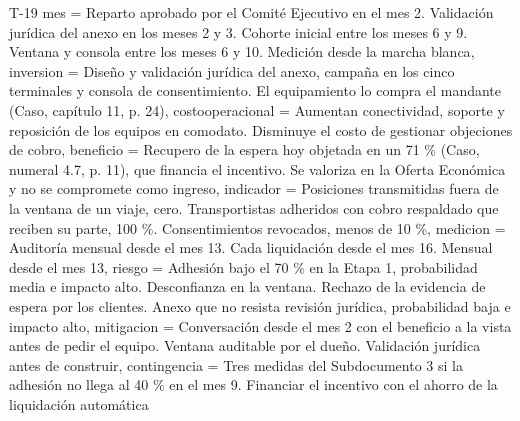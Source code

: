\begin{formulario}{T-19}
{  mes = {Reparto aprobado por el Comité Ejecutivo en el mes 2. Validación jurídica del anexo en los meses 2 y 3. Cohorte inicial entre los meses 6 y 9. Ventana y consola entre los meses 6 y 10. Medición desde la marcha blanca},
  inversion = {Diseño y validación jurídica del anexo, campaña en los cinco terminales y consola de consentimiento. El equipamiento lo compra el mandante (Caso, capítulo 11, p. 24)},
  costooperacional = {Aumentan conectividad, soporte y reposición de los equipos en comodato. Disminuye el costo de gestionar objeciones de cobro},
  beneficio = {Recupero de la espera hoy objetada en un 71 \% (Caso, numeral 4.7, p. 11), que financia el incentivo. Se valoriza en la Oferta Económica y no se compromete como ingreso},
  indicador = {Posiciones transmitidas fuera de la ventana de un viaje, cero. Transportistas adheridos con cobro respaldado que reciben su parte, 100 \%. Consentimientos revocados, menos de 10 \%},
  medicion = {Auditoría mensual desde el mes 13. Cada liquidación desde el mes 16. Mensual desde el mes 13},
  riesgo = {Adhesión bajo el 70 \% en la Etapa 1, probabilidad media e impacto alto. Desconfianza en la ventana. Rechazo de la evidencia de espera por los clientes. Anexo que no resista revisión jurídica, probabilidad baja e impacto alto},
  mitigacion = {Conversación desde el mes 2 con el beneficio a la vista antes de pedir el equipo. Ventana auditable por el dueño. Validación jurídica antes de construir},
  contingencia = {Tres medidas del Subdocumento 3 si la adhesión no llega al 40 \% en el mes 9. Financiar el incentivo con el ahorro de la liquidación automática}
}
\end{formulario}
